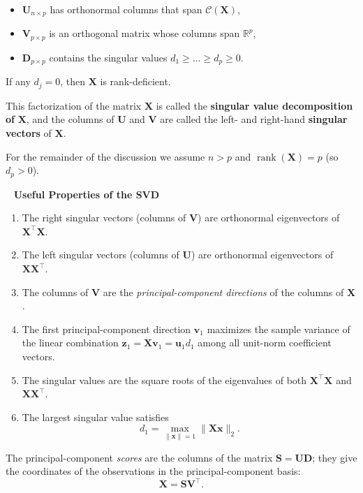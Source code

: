 \documentclass[
]{book}
\begin{document}
\begin{itemize}
\item
  \(\mathbf{U}_{n\times p}\) has orthonormal columns that span \(\mathcal{C}(\mathbf{X})\),
\item
  \(\mathbf{V}_{p\times p}\) is an orthogonal matrix whose columns span \(\mathbb{R}^p\),
\item
  \(\mathbf{D}_{p\times p}\) contains the singular values \(d_1\ge\dots\ge d_p\ge 0\).
\end{itemize}

If any \(d_j=0\), then \(\mathbf{X}\) is rank-deficient.

This factorization of the matrix \(\mathbf{X}\) is called the \textbf{singular value decomposition of} \(\mathbf{X}\), and the columns of \(\mathbf{U}\) and \(\mathbf{V}\) are called the left- and right-hand \textbf{singular vectors} of \(\mathbf{X}\).

For the remainder of the discussion we assume \(n>p\) and \(\operatorname{rank}(\mathbf{X})=p\) (so \(d_p>0\)).

~
\textbf{Useful Properties of the SVD}

\begin{enumerate}
\def\labelenumi{\arabic{enumi}.}
\item
  The right singular vectors (columns of \(\mathbf{V}\)) are orthonormal eigenvectors of \(\mathbf{X}^\top\mathbf{X}\).
\item
  The left singular vectors (columns of \(\mathbf{U}\)) are orthonormal eigenvectors of \(\mathbf{X}\mathbf{X}^\top\).
\item
  The columns of \(\mathbf{V}\) are the \emph{principal-component directions} of the columns of \(\mathbf{X}\).
\item
  The first principal-component direction \(\mathbf{v}_1\) maximizes the sample variance of the linear combination \(\mathbf{z}_1=\mathbf{X}\mathbf{v}_1=\mathbf{u}_1 d_1\) among all unit-norm coefficient vectors.
\item
  The singular values are the square roots of the eigenvalues of both \(\mathbf{X}^\top\mathbf{X}\) and \(\mathbf{X}\mathbf{X}^\top\).
\item
  The largest singular value satisfies
  \[
  d_1=\max_{\|\mathbf{x}\|=1}\|\mathbf{X}\mathbf{x}\|_2.
  \]
\end{enumerate}

The principal-component \emph{scores} are the columns of the matrix \(\mathbf{S}=\mathbf{U}\mathbf{D}\); they give the coordinates of the observations in the principal-component basis:
\[
\mathbf{X}=\mathbf{S}\mathbf{V}^\top.
\]
~
\end{document}
